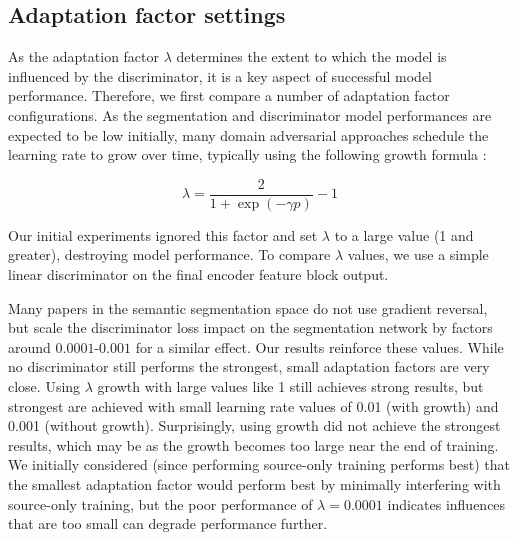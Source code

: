 \documentclass[a4paper,12pt]{report}
\begin{document}
\begin{table}[]
    \caption{Baseline experiment results comparing SegFormer and DeeplabV3+. Both experiments used a simplified DCGAN-like \cite{radford_unsupervised_2016} discriminator consisting of 3 convolutional layers with 64, 128, and 2 channels respectively.}
    \label{tab:das-baseline-experiment}
\end{table}

\subsection{Adaptation factor settings}
As the adaptation factor $\lambda$ determines the extent to which the model is influenced by the discriminator, it is a key aspect of successful model performance. Therefore, we first compare a number of adaptation factor configurations. As the segmentation and discriminator model performances are expected to be low initially, many domain adversarial approaches schedule the learning rate to grow over time, typically using the following growth formula \cite{ganin_domain-adversarial_2016}:

\begin{equation}
    \lambda = \frac{2}{1 + \exp(-\gamma p)} - 1
\end{equation}

Our initial experiments ignored this factor and set $\lambda$ to a large value (1 and greater), destroying model performance. To compare $\lambda$ values, we use a simple linear discriminator on the final encoder feature block output.

Many papers in the semantic segmentation space do not use gradient reversal, but scale the discriminator loss impact on the segmentation network by factors around $0.0001$-$0.001$ for a similar effect. Our results reinforce these values. While no discriminator still performs the strongest, small adaptation factors are very close. Using $\lambda$ growth with large values like 1 still achieves strong results, but strongest are achieved with small learning rate values of 0.01 (with growth) and 0.001 (without growth). Surprisingly, using growth did not achieve the strongest results, which may be as the growth becomes too large near the end of training. We initially considered (since performing source-only training performs best) that the smallest adaptation factor would perform best by minimally interfering with source-only training, but the poor performance of $\lambda = 0.0001$ indicates influences that are too small can degrade performance further.
\end{document}
